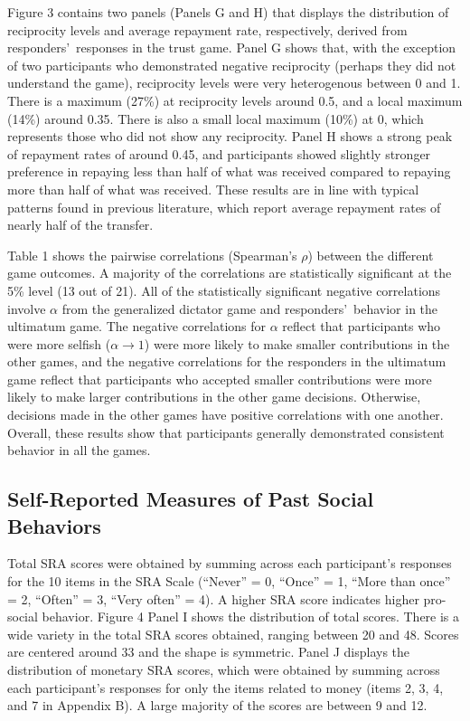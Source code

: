 \documentclass[12pt]{article}
\begin{document}
Figure 3 contains two panels (Panels G and H) that displays the distribution of reciprocity levels and average repayment rate, respectively, derived from responders\rq \ responses in the trust game. Panel G shows that, with the exception of two participants who demonstrated negative reciprocity (perhaps they did not understand the game), reciprocity levels were very heterogenous between 0 and 1. There is a maximum (27\%) at reciprocity levels around 0.5, and a local maximum (14\%) around 0.35. There is also a small local maximum (10\%) at 0, which represents those who did not show any reciprocity. Panel H shows a strong peak of repayment rates of around 0.45, and participants showed slightly stronger preference in repaying less than half of what was received compared to repaying more than half of what was received. These results are in line with typical patterns found in previous literature, which report average repayment rates of nearly half of the transfer.

Table 1 shows the pairwise correlations (Spearman\rq s \(\rho\)) between the different game outcomes. A majority of the correlations are statistically significant at the 5\% level (13 out of 21). All of the statistically significant negative correlations involve \(\alpha\) from the generalized dictator game and responders\rq \ behavior in the ultimatum game. The negative correlations for \(\alpha\) reflect that participants who were more selfish (\(\alpha \rightarrow 1\)) were more likely to make smaller contributions in the other games, and the negative correlations for the responders in the ultimatum game reflect that participants who accepted smaller contributions were more likely to make larger contributions in the other game decisions. Otherwise, decisions made in the other games have positive correlations with one another. Overall, these results show that participants generally demonstrated consistent behavior in all the games.

\subsection{Self-Reported Measures of Past Social Behaviors}

Total SRA scores were obtained by summing across each participant\rq s responses for the 10 items in the SRA Scale (``Never'' = 0, ``Once'' = 1, ``More than once'' = 2, ``Often'' = 3, ``Very often'' = 4). A higher SRA score indicates higher pro-social behavior. Figure 4 Panel I shows the distribution of total scores. There is a wide variety in the total SRA scores obtained, ranging between 20 and 48. Scores are centered around 33 and the shape is symmetric. Panel J displays the distribution of monetary SRA scores, which were obtained by summing across each participant\rq s responses for only the items related to money (items 2, 3, 4, and 7 in Appendix B).  A large majority of the scores are between 9 and 12.
\end{document}
